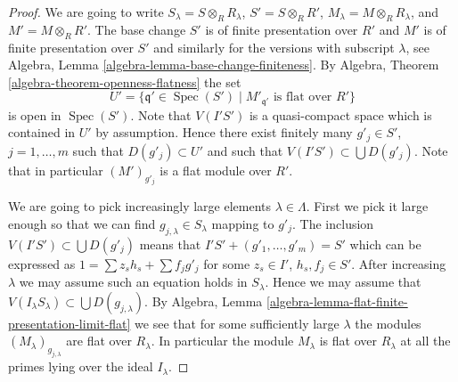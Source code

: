 \documentclass[10pt,a4paper]{amsart}
\theoremstyle{plain}
\theoremstyle{definition}
\theoremstyle{remark}
\numberwithin{equation}{subsection}
\def\Spec{\mathop{\mathrm{Spec}}}
\begin{document}
\begin{proof}
We are going to write $S_\lambda = S \otimes_R R_\lambda$,
$S' = S \otimes_R R'$, $M_\lambda = M \otimes_R R_\lambda$, and
$M' = M \otimes_R R'$.
The base change $S'$ is of finite presentation over $R'$ and
$M'$ is of finite presentation over $S'$ and similarly for the
versions with subscript $\lambda$, see
Algebra, Lemma \ref{algebra-lemma-base-change-finiteness}.
By
Algebra, Theorem \ref{algebra-theorem-openness-flatness}
the set
$$
U' = \{\mathfrak q' \in \Spec(S') \mid
M'_{\mathfrak q'}\text{ is flat over }R'\}
$$
is open in $\Spec(S')$. Note that $V(I'S')$ is a quasi-compact space
which is contained in $U'$ by assumption. Hence there exist finitely many
$g'_j \in S'$, $j = 1, \ldots, m$ such that $D(g'_j) \subset U'$ and such
that $V(I'S') \subset \bigcup D(g'_j)$.
Note that in particular $(M')_{g'_j}$ is a flat module over $R'$.

\medskip\noindent
We are going to pick increasingly large elements $\lambda \in \Lambda$.
First we pick it large enough so that we can find
$g_{j, \lambda} \in S_{\lambda}$ mapping to $g'_j$.
The inclusion $V(I'S') \subset \bigcup D(g'_j)$ means that
$I'S' + (g'_1, \ldots, g'_m) = S'$ which can be expressed as
$1 = \sum z_sh_s + \sum f_jg'_j$ for some $z_s \in I'$, $h_s, f_j \in S'$.
After increasing $\lambda$ we may assume such an equation holds in
$S_\lambda$. Hence we may assume that
$V(I_\lambda S_\lambda) \subset \bigcup D(g_{j, \lambda})$. By
Algebra, Lemma \ref{algebra-lemma-flat-finite-presentation-limit-flat}
we see that for some sufficiently large $\lambda$ the modules
$(M_\lambda)_{g_{j, \lambda}}$ are flat over $R_\lambda$.
In particular the module $M_\lambda$ is flat over $R_\lambda$
at all the primes lying over the ideal $I_\lambda$.
\end{proof}
\end{document}

